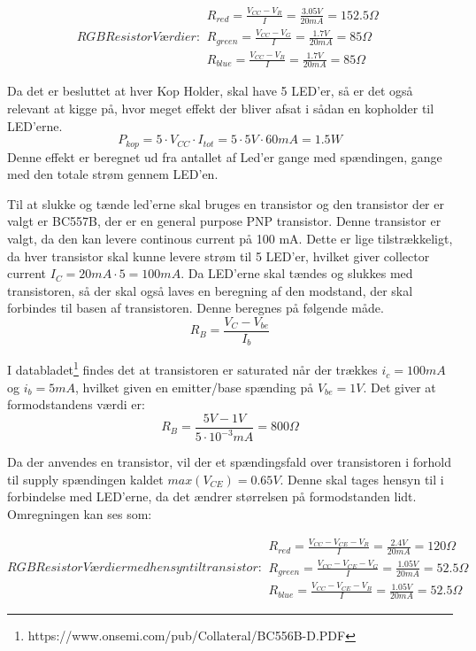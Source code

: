 \documentclass[HardwareDesign/HardwareDesign_main.tex]{subfiles}
\begin{document}
\begin{subequations}
        RGB Resistor Værdier:
\begin{align}
        R_{red}=\frac{V_{CC}-V_R}{I}=\frac{3.05V}{20mA}=152.5\Omega\\
        R_{green}=\frac{V_{CC}-V_G}{I}=\frac{1.7V}{20mA}=85\Omega\\
        R_{blue}=\frac{V_{CC}-V_B}{I}=\frac{1.7V}{20mA}=85\Omega
\end{align}
\end{subequations}

Da det er besluttet at hver Kop Holder, skal have 5 LED'er, så er det også relevant at kigge på, hvor meget effekt der bliver afsat i sådan en kopholder til LED'erne.
\begin{equation}
    P_{kop}=5\cdot V_{CC}\cdot I_{tot} = 5\cdot 5V\cdot 60mA = 1.5W
\end{equation}
Denne effekt er beregnet ud fra antallet af Led'er gange med spændingen, gange med den totale strøm gennem LED'en.

Til at slukke og tænde led'erne skal bruges en transistor og den transistor der er valgt er BC557B, der er en general purpose PNP transistor. Denne transistor er valgt, da den kan levere continous current på 100 mA. Dette er lige tilstrækkeligt, da hver transistor skal kunne levere strøm til 5 LED'er, hvilket giver collector current $I_C=20mA\cdot5=100mA$.
Da LED'erne skal tændes og slukkes med transistoren, så der skal også laves en beregning af den modstand, der skal forbindes til basen af transistoren.
Denne beregnes på følgende måde.
\begin{equation}
    R_B = \frac{V_C-V_{be}}{I_b}
\end{equation}

I databladet\footnote{https://www.onsemi.com/pub/Collateral/BC556B-D.PDF} findes det at transistoren er saturated når der trækkes $i_c=100mA$ og $i_b=5mA$, hvilket given en emitter/base spænding på $V_{be}=1V$. Det giver at formodstandens værdi er:
\begin{equation}
    R_B = \frac{5V-1V}{5\cdot 10^{-3} mA}=800\Omega
\end{equation}

Da der anvendes en transistor, vil der et spændingsfald over transistoren i forhold til supply spændingen kaldet $max(V_{CE})=0.65V$. Denne skal tages hensyn til i forbindelse med LED'erne, da det ændrer størrelsen på formodstanden lidt. Omregningen kan ses som:

\begin{subequations}
        RGB Resistor Værdier med hensyn til transistor:
\begin{align}
        R_{red}=\frac{V_{CC}-V_{CE}-V_R}{I}=\frac{2.4V}{20mA}=120\Omega\\
        R_{green}=\frac{V_{CC}-V_{CE}-V_G}{I}=\frac{1.05V}{20mA}=52.5\Omega\\
        R_{blue}=\frac{V_{CC}-V_{CE}-V_B}{I}=\frac{1.05V}{20mA}=52.5\Omega
\end{align}
\end{subequations}
\end{document}
